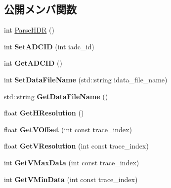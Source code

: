 \subsection*{公開メンバ関数}
\begin{DoxyCompactItemize}
\item 
int \hyperlink{class_t_k_d_a_t_a_aa3908aef9f0e122bf8edf4ae39242304}{Parse\+H\+DR} ()
\item 
\mbox{\label{class_t_k_d_a_t_a_a64f288a761012bf276a5aa7f74dfcb44}} 
int {\bfseries Set\+A\+D\+C\+ID} (int iadc\+\_\+id)
\item 
\mbox{\label{class_t_k_d_a_t_a_ad0a8defdf8de2ef2bbe42d7d8a53e051}} 
int {\bfseries Get\+A\+D\+C\+ID} ()
\item 
\mbox{\label{class_t_k_d_a_t_a_ae63b673fda97ff6fef659f51fe40dbe8}} 
int {\bfseries Set\+Data\+File\+Name} (std\+::string idata\+\_\+file\+\_\+name)
\item 
\mbox{\label{class_t_k_d_a_t_a_a3f354a0eb29025867cbd1e3e27f8e41a}} 
std\+::string {\bfseries Get\+Data\+File\+Name} ()
\item 
\mbox{\label{class_t_k_d_a_t_a_a0f0c38948586490c1bfe1f820418c5ef}} 
float {\bfseries Get\+H\+Resolution} ()
\item 
\mbox{\label{class_t_k_d_a_t_a_a6c83babefbef168db08ca1c00cfe560d}} 
float {\bfseries Get\+V\+Offset} (int const trace\+\_\+index)
\item 
\mbox{\label{class_t_k_d_a_t_a_a78fccdabf4c7326ecb9dbe30ebe765e4}} 
float {\bfseries Get\+V\+Resolution} (int const trace\+\_\+index)
\item 
\mbox{\label{class_t_k_d_a_t_a_aaa91499a0c86542c6d240f07b2c7a5a6}} 
int {\bfseries Get\+V\+Max\+Data} (int const trace\+\_\+index)
\item 
\mbox{\label{class_t_k_d_a_t_a_aed38093c0f7a086ab190c89770567531}} 
int {\bfseries Get\+V\+Min\+Data} (int const trace\+\_\+index)
\item 
\mbox{\label{class_t_k_d_a_t_a_a5fe237cba051e352845786e13c0cd54f}} 

\end{DoxyCompactItemize}
